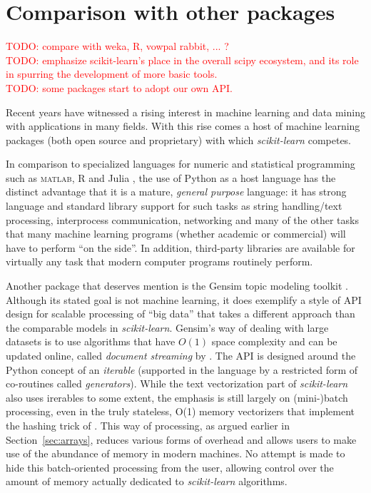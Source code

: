 \documentclass{llncs}
\newcommand{\sklearn}{\textit{scikit-learn}\xspace}
\begin{document}
\section{Comparison with other packages}

\label{sec:comparison}

\textcolor{red}{TODO: compare with weka, R, vowpal rabbit, ... ?}\\
\textcolor{red}{TODO: emphasize scikit-learn's place in the overall scipy ecosystem, and its role in spurring the development of more basic tools.}\\
\textcolor{red}{TODO: some packages start to adopt our own API.}

Recent years have witnessed a rising interest in machine learning and data mining
with applications in many fields.
With this rise comes a host of machine learning packages
(both open source and proprietary) with which \sklearn competes.

In comparison to specialized languages for numeric and statistical programming
such as \textsc{matlab}, R \citep{trancon2012r} and Julia \citep{bezanson2012julia},
the use of Python as a host language has the distinct advantage
that it is a mature, \textit{general purpose} language:
it has strong language and standard library support for such tasks as
string handling/text processing, interprocess communication, networking
and many of the other tasks that many machine learning programs
(whether academic or commercial)
will have to perform ``on the side''.
In addition, third-party libraries are available for virtually any task
that modern computer programs routinely perform.

Another package that deserves mention is the Gensim topic modeling toolkit
\citep{rehurek2010gensim}.
Although its stated goal is not machine learning,
it does exemplify a style of API design for scalable processing of ``big data''
that takes a different approach than the comparable models in \sklearn.
Gensim's way of dealing with large datasets is to use algorithms
that have $O(1)$ space complexity and can be updated online,
called \textit{document streaming} by \citeauthor{rehurek2010gensim}.
The API is designed around the Python concept of an \textit{iterable}
(supported in the language by a restricted form of co-routines called
\textit{generators}).
While the text vectorization part of \sklearn
also uses irerables to some extent,
the emphasis is still largely on (mini-)batch processing,
even in the truly stateless, O(1) memory vectorizers
that implement the hashing trick of \citet{weinberger2009}.
This way of processing, as argued earlier in Section~\ref{sec:arrays},
reduces various forms of overhead
and allows users to make use of the abundance of memory in modern machines.
No attempt is made to hide this batch-oriented processing from the user,
allowing control over the amount of memory actually dedicated
to \sklearn algorithms.
\end{document}
